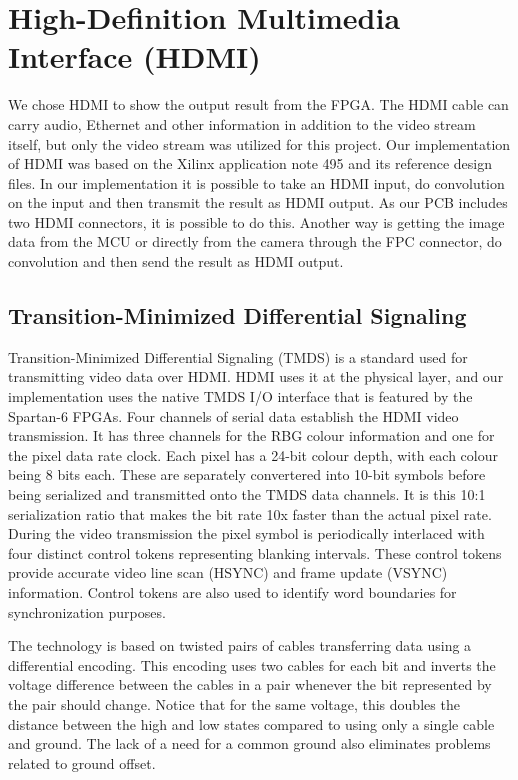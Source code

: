 \section{High-Definition Multimedia Interface (HDMI)}
We chose HDMI to show the output result from the FPGA.
The HDMI cable can carry audio, Ethernet and other information in addition to the video stream itself, but only the video stream was utilized for this project.
Our implementation of HDMI was based on the Xilinx application note 495 \cite{xapp495} and its reference design files.
In our implementation it is possible to take an HDMI input, do convolution on the input and then transmit the result as HDMI output.
As our PCB includes two HDMI connectors, it is possible to do this.
Another way is getting the image data from the MCU or directly from the camera through the FPC connector, do convolution and then send the result as HDMI output.

\subsection{Transition-Minimized Differential Signaling}
Transition-Minimized Differential Signaling (TMDS) is a standard used for transmitting video data over HDMI.
HDMI uses it at the physical layer, and our implementation uses the native TMDS I/O interface that is featured by the Spartan-6 FPGAs.
Four channels of serial data establish the HDMI video transmission.
It has three channels for the RBG colour information and one for the pixel data rate clock.
Each pixel has a 24-bit colour depth, with each colour being 8 bits each.
These are separately convertered into 10-bit symbols before being serialized and transmitted onto the TMDS data channels.
It is this 10:1 serialization ratio that makes the bit rate 10x faster than the actual pixel rate.
During the video transmission the pixel symbol is periodically interlaced with four distinct control tokens representing blanking intervals.
These control tokens provide accurate video line scan (HSYNC) and frame update (VSYNC) information.
Control tokens are also used to identify word boundaries for synchronization purposes.

The technology is based on twisted pairs of cables transferring data using a differential encoding.
This encoding uses two cables for each bit and inverts the voltage difference between the cables in a pair whenever the bit represented by the pair should change.
Notice that for the same voltage, this doubles the distance between the high and low states compared to using only a single cable and ground.
The lack of a need for a common ground also eliminates problems related to ground offset.

